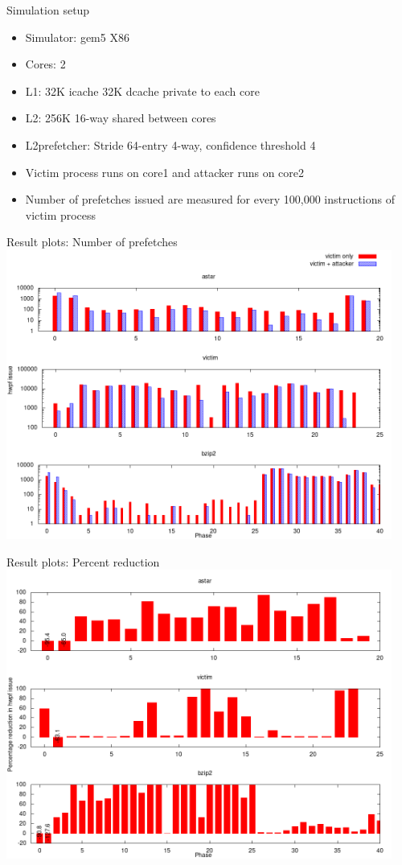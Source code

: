 \documentclass[10pt]{beamer}
\begin{document}
\begin{frame}{Simulation setup}
    \begin{itemize}
        \item Simulator: gem5 X86
        \item Cores: 2
        \item L1: 32K icache 32K dcache private to each core
        \item L2: 256K 16-way shared between cores
        \item L2prefetcher: Stride 64-entry 4-way, confidence threshold 4
        \vspace{2em}
        \item Victim process runs on core1 and attacker runs on core2
        \item Number of prefetches issued are measured for every 100,000 instructions of victim process
    \end{itemize}
\end{frame}

\begin{frame}{Result plots: Number of prefetches}
    \includegraphics[width=0.95\textwidth]{hwpf_num.png}
\end{frame}
\begin{frame}{Result plots: Percent reduction}
    \includegraphics[width=0.95\textwidth]{hwpf_perc.png}
\end{frame}
\end{document}
